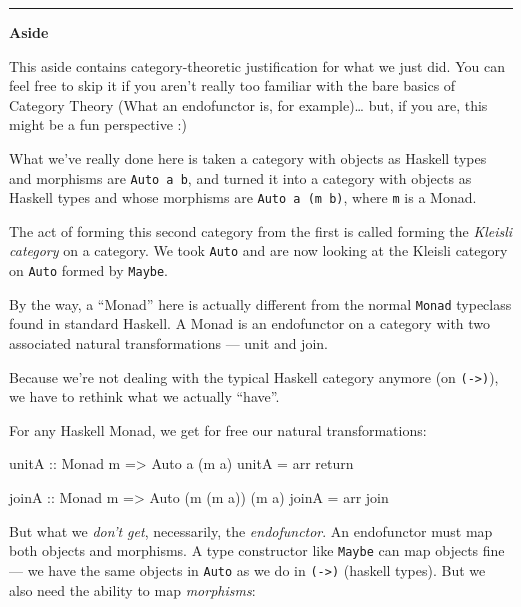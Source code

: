 \documentclass[]{article}
\newenvironment{Shaded}{}{}
\newcommand{\DataTypeTok}[1]{\textcolor[rgb]{0.56,0.13,0.00}{{#1}}}
\newcommand{\OtherTok}[1]{\textcolor[rgb]{0.00,0.44,0.13}{{#1}}}
\newcommand{\FunctionTok}[1]{\textcolor[rgb]{0.02,0.16,0.49}{{#1}}}
\newcommand{\NormalTok}[1]{{#1}}
\begin{document}
\begin{center}\rule{0.5\linewidth}{\linethickness}\end{center}

\textbf{Aside}

This aside contains category-theoretic justification for what we just
did. You can feel free to skip it if you aren't really too familiar with
the bare basics of Category Theory (What an endofunctor is, for
example)\ldots{} but, if you are, this might be a fun perspective :)

What we've really done here is taken a category with objects as Haskell
types and morphisms are \texttt{Auto\ a\ b}, and turned it into a
category with objects as Haskell types and whose morphisms are
\texttt{Auto\ a\ (m\ b)}, where \texttt{m} is a Monad.

The act of forming this second category from the first is called forming
the \emph{Kleisli category} on a category. We took \texttt{Auto} and are
now looking at the Kleisli category on \texttt{Auto} formed by
\texttt{Maybe}.

By the way, a ``Monad'' here is actually different from the normal
\texttt{Monad} typeclass found in standard Haskell. A Monad is an
endofunctor on a category with two associated natural transformations
--- unit and join.

Because we're not dealing with the typical Haskell category anymore (on
\texttt{(-\textgreater{})}), we have to rethink what we actually
``have''.

For any Haskell Monad, we get for free our natural transformations:

\begin{Shaded}
\begin{Highlighting}[]
\OtherTok{unitA ::} \DataTypeTok{Monad} \NormalTok{m }\OtherTok{=>} \DataTypeTok{Auto} \NormalTok{a (m a)}
\NormalTok{unitA }\FunctionTok{=} \NormalTok{arr return}

\OtherTok{joinA ::} \DataTypeTok{Monad} \NormalTok{m }\OtherTok{=>} \DataTypeTok{Auto} \NormalTok{(m (m a)) (m a)}
\NormalTok{joinA }\FunctionTok{=} \NormalTok{arr join}
\end{Highlighting}
\end{Shaded}

But what we \emph{don't get}, necessarily, the \emph{endofunctor}. An
endofunctor must map both objects and morphisms. A type constructor like
\texttt{Maybe} can map objects fine --- we have the same objects in
\texttt{Auto} as we do in \texttt{(-\textgreater{})} (haskell types).
But we also need the ability to map \emph{morphisms}:
\end{document}
